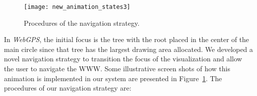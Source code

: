 \documentclass[10pt,psfig]{article}
\begin{document}
{\begin{figure}[t]
\centering
\texttt{[image: new\_animation\_states3]}
\caption{Procedures of the navigation strategy.}
\label{fig_animate}
\end{figure}

In {\em WebGPS}, the initial focus is the tree with the root placed in the center of the main circle since that tree has the largest drawing area allocated.  
We developed a novel navigation strategy to transition the focus of the visualization and allow the user to navigate the WWW.
Some illustrative screen shots of how this animation is implemented in our system are presented in Figure~\ref{fig_animate}.
The procedures of our navigation strategy are:









}
\end{document}
